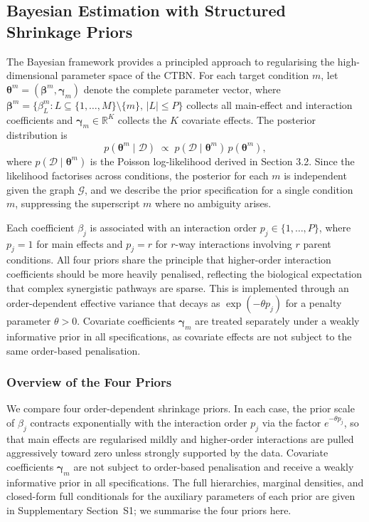 \documentclass[12pt]{article}
\begin{document}
\subsection{Bayesian Estimation with Structured Shrinkage Priors}

The Bayesian framework provides a principled approach to regularising the high-dimensional parameter space of the CTBN. For each target condition $m$, let $\boldsymbol{\theta}^m = (\boldsymbol{\beta}^m, \boldsymbol{\gamma}_m)$ denote the complete parameter vector, where $\boldsymbol{\beta}^m = \{\beta^m_L : L \subseteq \{1,\dots,M\}\setminus\{m\},\, |L| \leq P\}$ collects all main-effect and interaction coefficients and $\boldsymbol{\gamma}_m \in \mathbb{R}^K$ collects the $K$ covariate effects. The posterior distribution is
\[
p(\boldsymbol{\theta}^m \mid \mathcal{D}) \;\propto\; p(\mathcal{D} \mid \boldsymbol{\theta}^m)\, p(\boldsymbol{\theta}^m),
\]
where $p(\mathcal{D} \mid \boldsymbol{\theta}^m)$ is the Poisson log-likelihood derived in Section 3.2. Since the likelihood factorises across conditions, the posterior for each $m$ is independent given the graph $\mathcal{G}$, and we describe the prior specification for a single condition $m$, suppressing the superscript $m$ where no ambiguity arises.

Each coefficient $\beta_j$ is associated with an interaction order $p_j \in \{1, \dots, P\}$, where $p_j = 1$ for main effects and $p_j = r$ for $r$-way interactions involving $r$ parent conditions. All four priors share the principle that higher-order interaction coefficients should be more heavily penalised, reflecting the biological expectation that complex synergistic pathways are sparse. This is implemented through an order-dependent effective variance that decays as $\exp(-\theta p_j)$ for a penalty parameter $\theta > 0$. Covariate coefficients $\boldsymbol{\gamma}_m$ are treated separately under a weakly informative prior in all specifications, as covariate effects are not subject to the same order-based penalisation.

\subsubsection{Overview of the Four Priors}

We compare four order-dependent shrinkage priors. In each case, the prior scale of $\beta_j$ contracts exponentially with the interaction order $p_j$ via the factor $e^{-\theta p_j}$, so that main effects are regularised mildly and higher-order interactions are pulled aggressively toward zero unless strongly supported by the data. Covariate coefficients $\boldsymbol{\gamma}_m$ are not subject to order-based penalisation and receive a weakly informative prior in all specifications. The full hierarchies, marginal densities, and closed-form full conditionals for the auxiliary parameters of each prior are given in Supplementary Section~S1; we summarise the four priors here.
\end{document}
